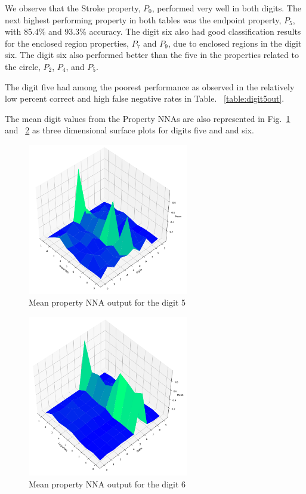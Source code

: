 \documentclass[conference]{IEEEtran}
\begin{document}
We observe that the Stroke property, $P_0$, performed very well in both digits.  The next highest performing property in both tables was the endpoint property, $P_5$, with 85.4\% and 93.3\% accuracy.  The digit six also had good classification results for the enclosed region properties, $P_7$ and $P_9$, due to enclosed regions in the digit six.  The digit six also performed better than the five in the properties related to the circle, $P_2$, $P_4$, and $P_5$.

The digit five had among the poorest performance as observed in the relatively low percent correct and high false negative rates in Table. ~\ref{table:digit5out}.

The mean digit values from the Property NNAs are also represented  in Fig.~\ref{digit5votes} and ~\ref{digit6votes} as three dimensional surface plots for digits five and  and six.

\begin{figure}[htbp]
\centerline{\includegraphics[width=70mm]{./images/digit-5.png}}
\caption{Mean property NNA output for the digit 5}
\label{digit5votes}
\end{figure}

\begin{figure}[htbp]
\centerline{\includegraphics[width=70mm]{./images/digit-6.png}}
\caption{Mean property NNA output for the digit 6}
\label{digit6votes}
\end{figure}
\end{document}
